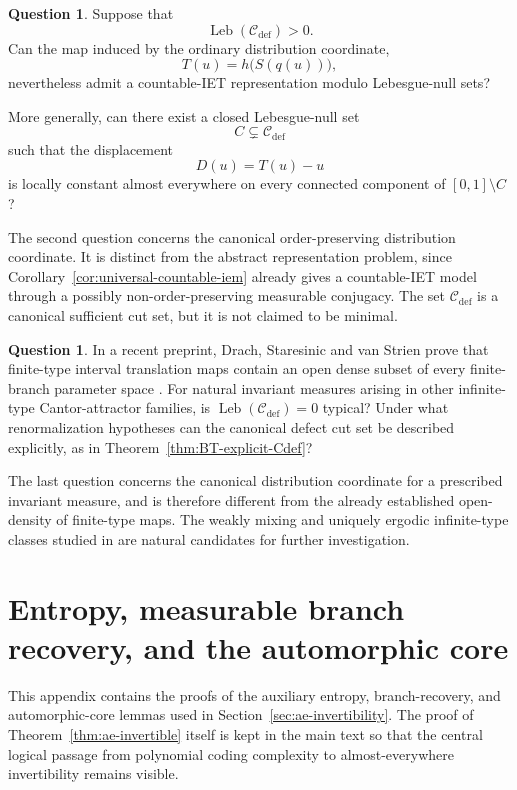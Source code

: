 \documentclass[11pt]{amsart}
\theoremstyle{plain}
\theoremstyle{definition}
\newtheorem{question}[theorem]{Question}
\theoremstyle{remark}
\DeclareMathOperator{\Leb}{Leb}
\newcommand{\cC}{\mathcal C}
\begin{document}
\begin{question}
Suppose that
\[
        \Leb(\cC_{\mathrm{def}})>0.
\]
Can the map induced by the ordinary distribution coordinate,
\[
        T(u)=h\bigl(S(q(u))\bigr),
\]
nevertheless admit a countable-IET representation modulo Lebesgue-null sets?

More generally, can there exist a closed Lebesgue-null set
\[
        C\subsetneq\cC_{\mathrm{def}}
\]
such that the displacement
\[
        D(u)=T(u)-u
\]
is locally constant almost everywhere on every connected component of
\([0,1]\setminus C\)?
\end{question}

The second question concerns the canonical order-preserving distribution coordinate. It is
distinct from the abstract representation problem, since Corollary~\ref{cor:universal-countable-iem}
already gives a countable-IET model through a possibly non-order-preserving measurable
conjugacy. The set \(\cC_{\mathrm{def}}\) is a canonical sufficient cut set, but it is not
claimed to be minimal.

\begin{question}
In a recent preprint, Drach, Staresinic and van Strien prove that finite-type interval
translation maps contain an open dense subset of every finite-branch parameter space
\cite{DrachStaresinicVanStrien2026}. For natural invariant measures arising in other
infinite-type Cantor-attractor families, is \(\Leb(\cC_{\mathrm{def}})=0\) typical? Under
what renormalization hypotheses can the canonical defect cut set be described explicitly, as in
Theorem~\ref{thm:BT-explicit-Cdef}?
\end{question}

The last question concerns the canonical distribution coordinate for a prescribed invariant
measure, and is therefore different from the already established open-density of finite-type
maps. The weakly mixing and uniquely ergodic infinite-type classes studied in
\cite{BruinRadinger2026,SkripchenkoChernyi2026} are natural candidates for further
investigation.



\appendix

\section{Entropy, measurable branch recovery, and the automorphic core}
\label{app:entropy-automorphic-details}

This appendix contains the proofs of the auxiliary entropy, branch-recovery, and
automorphic-core lemmas used in Section~\ref{sec:ae-invertibility}. The proof of
Theorem~\ref{thm:ae-invertible} itself is kept in the main text so that the central logical
passage from polynomial coding complexity to almost-everywhere invertibility remains visible.
\end{document}
